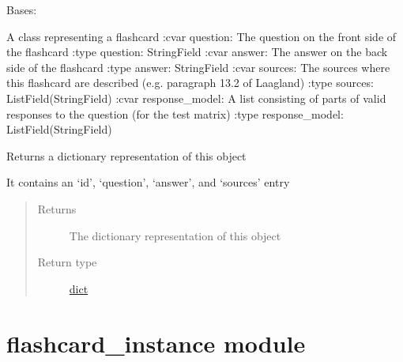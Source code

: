 \documentclass[letterpaper,10pt,english]{sphinxmanual}
\begin{document}
\begin{fulllineitems}
\label{\detokenize{flashcard:flashcard.Flashcard}}
Bases: 

A class representing a flashcard
:cvar question: The question on the front side of the flashcard
:type question: StringField
:cvar answer: The answer on the back side of the flashcard
:type answer: StringField
:cvar sources: The sources where this flashcard are described (e.g. paragraph 13.2 of Laagland)
:type sources: ListField(StringField)
:cvar response\_model: A list consisting of parts of valid responses to the question (for the test matrix)
:type response\_model: ListField(StringField)

\begin{fulllineitems}
\label{\detokenize{flashcard:flashcard.Flashcard.to_dict}}
Returns a dictionary representation of this object

It contains an `id', `question', `answer', and `sources' entry
\begin{quote}\begin{description}
\item[{Returns}] \leavevmode
The dictionary representation of this object

\item[{Return type}] \leavevmode
\href{https://docs.python.org/2/library/stdtypes.html\#dict}{dict}

\end{description}\end{quote}

\end{fulllineitems}


\end{fulllineitems}



\chapter{flashcard\_instance module}
\label{\detokenize{flashcard_instance:module-flashcard_instance}}\label{\detokenize{flashcard_instance::doc}}\label{\detokenize{flashcard_instance:flashcard-instance-module}}
\end{document}
